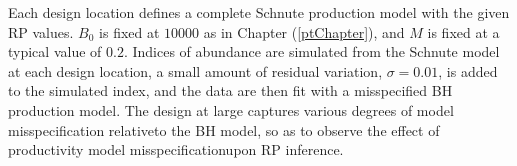 %
Each design location defines a complete Schnute production model with the given
RP values. $B_0$ is fixed at $10000$ as in Chapter (\ref{ptChapter}), and $M$ 
is fixed at a typical value of $0.2$. Indices of abundance are simulated from 
the Schnute model at each design location, a small amount of residual variation, 
$\sigma=0.01$, is added to the simulated index, and the data are then fit 
with a misspecified BH production model. The design at large captures various 
degrees of model misspecification relativeto the BH model, so as to observe 
the effect of productivity model misspecificationupon RP inference.
%
%
%
%

